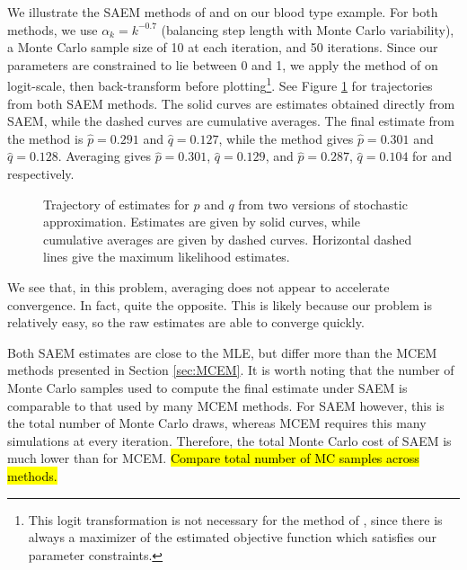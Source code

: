 \documentclass[11pt, oneside]{article}   	%
\begin{document}
We illustrate the SAEM methods of \citet{Gu98I} and \citet{Dey99} on our blood type example. For both methods, we use $\alpha_k = k^{-0.7}$ (balancing step length with Monte Carlo variability), a Monte Carlo sample size of 10 at each iteration, and 50 iterations. Since our parameters are constrained to lie between 0 and 1, we apply the method of \citeauthor{Gu98I} on logit-scale, then back-transform before plotting\footnote{This logit transformation is not necessary for the method of \citet{Dey99}, since there is always a maximizer of the estimated objective function which satisfies our parameter constraints.}. See Figure \ref{fig:blood_SAEM_traj} for trajectories from both SAEM methods. The solid curves are estimates obtained directly from SAEM, while the dashed curves are cumulative averages. The final estimate from the \citeauthor{Gu98I} method is $\hat{p} = 0.291$ and $\hat{q} = 0.127$, while the \citeauthor{Dey99} method gives $\hat{p} = 0.301$ and $\hat{q} = 0.128$. Averaging gives $\hat{p} = 0.301$, $\hat{q} = 0.129$, and $\hat{p} = 0.287$, $\hat{q} = 0.104$ for \citeauthor{Gu98I} and \citeauthor{Dey99} respectively.

\begin{figure}
    \centering
    \caption{Trajectory of estimates for $p$ and $q$ from two versions of stochastic approximation. Estimates are given by solid curves, while cumulative averages are given by dashed curves. Horizontal dashed lines give the maximum likelihood estimates.}

    
    \label{fig:blood_SAEM_traj}
\end{figure}

We see that, in this problem, averaging does not appear to accelerate convergence. In fact, quite the opposite. This is likely because our problem is relatively easy, so the raw estimates are able to converge quickly.

Both SAEM estimates are close to the MLE, but differ more than the MCEM methods presented in Section \ref{sec:MCEM}. It is worth noting that the number of Monte Carlo samples used to compute the final estimate under SAEM is comparable to that used by many MCEM methods. For SAEM however, this is the total number of Monte Carlo draws, whereas MCEM requires this many simulations at every iteration. Therefore, the total Monte Carlo cost of SAEM is much lower than for MCEM. \hl{Compare total number of MC samples across methods.}
\end{document}

